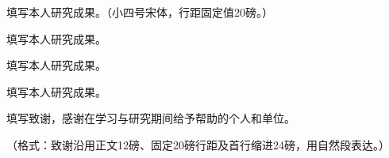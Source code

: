 \documentclass{研究生大论文模板}
\begin{document}
\begin{enumerate}[label={[\arabic*]},leftmargin=24bp,labelsep=6bp,itemsep=0bp,parsep=0bp,topsep=0bp]
  \item 填写本人研究成果。（小四号宋体，行距固定值20磅。）
  \item 填写本人研究成果。
  \item 填写本人研究成果。
  \item 填写本人研究成果。
\end{enumerate}

填写致谢，感谢在学习与研究期间给予帮助的个人和单位。

（格式：致谢沿用正文12磅、固定20磅行距及首行缩进24磅，用自然段表达。）
\end{document}
